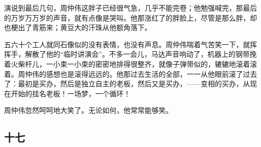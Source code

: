 \par 演说到最后几句，周仲伟这胖子已经很气急，几乎不能完卷；他勉强喊完，那最后的万岁万万岁的声音，就有点像是哭叫。他那涨红了的胖脸上，尽管是那么胖，却也梗出了青筋来；黄豆大的汗珠从他额角落下。
\par 五六十个工人就同石像似的没有表情，也没有声息。周仲伟喘着气苦笑一下，就挥挥手，解散了他的“临时讲演会”。不多一会儿，马达声音响动了，机器上的钢带挽着火柴杆儿，一小束一小束的密密地排得很整齐，就像子弹带似的，辘辘地滚着滚着。周仲伟的感想也是滚得远远的。他那过去生活的全部，一一从他眼前滚了过去了：最初是买办，然后是独立自主的老板，然后又是买办，——变相的买办，从现在开始的挂名老板！一场梦，一个循环！
\par 周仲伟忽然呵呵地大笑了。无论如何，他常常能够笑。



\subsection*{十七}

